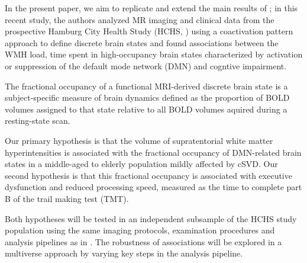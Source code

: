 In the present paper, we aim to replicate and extend the main results of \citep{Schlemm2022-he};
in this recent study, the authors analyzed MR imaging and clinical data from the prospective Hamburg City Health Study (HCHS, \citep{Jagodzinski2020-lx}) using a coactivation pattern approach to define discrete brain states and found associations between the WMH load, time spent in high-occupancy brain states characterized by activation or suppression of the default mode network (DMN) and cogntive impairment.

The fractional occupancy of a functional MRI-derived discrete brain state is a subject-specific measure of brain dynamics defined as the proportion of BOLD volumes assigned to that state relative to all BOLD volumes aquired during a resting-state scan.

Our primary hypothesis is that the volume of supratentorial white matter hyperintensities is associated with the fractional occupancy of DMN-related brain states in a middle-aged to elderly population mildly affected by cSVD.
Our second hypothesis is that this fractional occupancy is associated with executive dysfunction and reduced processing speed, measured as the time to complete part B of the trail making test (TMT).

Both hypotheses will be tested in an independent subsample of the HCHS study population using the same imaging protocols, examination procedures and analysis pipelines as in \citep{Schlemm2022-he}.
The robustness of associations will be explored in a multiverse approach by varying key steps in the analysis pipeline.

